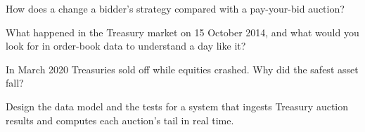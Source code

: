 \begin{interviewq}\label{iq:m2:the-treasury-market:3}
How does a  change a bidder's strategy compared with a
pay-your-bid auction?
\end{interviewq}

\begin{interviewq}\label{iq:m2:the-treasury-market:4}
What happened in the Treasury market on 15 October 2014, and what would you
look for in order-book data to understand a day like it?
\end{interviewq}

\begin{interviewq}\label{iq:m2:the-treasury-market:5}
In March 2020 Treasuries sold off while equities crashed. Why did the safest
asset fall?
\end{interviewq}

\begin{interviewq}\label{iq:m2:the-treasury-market:6}
Design the data model and the tests for a system that ingests Treasury
auction results and computes each auction's tail in real time.
\end{interviewq}
